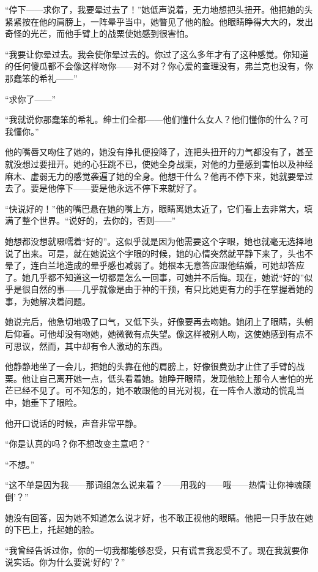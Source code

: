 \par “停下——求你了，我要晕过去了！”她低声说着，无力地想把头扭开。他把她的头紧紧按在他的肩膀上，一阵晕乎当中，她瞥见了他的脸。他眼睛睁得大大的，发出奇怪的光芒，而他手臂上的战栗使她感到很害怕。
\par “我要让你晕过去。我会使你晕过去的。你过了这么多年才有了这种感觉。你知道的任何傻瓜都不会像这样吻你——对不对？你心爱的查理没有，弗兰克也没有，你那蠢笨的希礼——”
\par “求你了——”
\par “我就说你那蠢笨的希礼。绅士们全都——他们懂什么女人？他们懂你的什么？可我懂你。”
\par 他的嘴唇又吻住了她的，她没有挣扎便投降了，连把头扭开的力气都没有了，甚至就没想过要扭开。她的心狂跳不已，使她全身战栗，对他的力量感到害怕以及神经麻木、虚弱无力的感觉袭遍了她的全身。他想干什么？他再不停下来，她就要晕过去了。要是他停下——要是他永远不停下来就好了。
\par “快说好的！”他的嘴巴悬在她的嘴上方，眼睛离她太近了，它们看上去非常大，填满了整个世界。“说好的，去你的，否则——”
\par 她想都没想就嗫嚅着“好的”。这似乎就是因为他需要这个字眼，她也就毫无选择地说了出来。可是，就在她说这个字眼的时候，她的心情突然就平静下来了，头也不晕了，连白兰地造成的晕乎感也减弱了。她根本无意答应跟他结婚，可她却答应了。她几乎都不知道这一切都是怎么一回事，可她并不后悔。现在，她说“好的”似乎是很自然的事——几乎就像是由于神的干预，有只比她更有力的手在掌握着她的事，为她解决着问题。
\par 她说完后，他急切地吸了口气，又低下头，好像要再去吻她。她闭上了眼睛，头朝后仰着。可他却没有吻她，她微微有点失望。像这样被别人吻，这使她感到有点不可思议，然而，其中却有令人激动的东西。
\par 他静静地坐了一会儿，把她的头靠在他的肩膀上，好像很费劲才止住了手臂的战栗。他让自己离开她一点，低头看着她。她睁开眼睛，发现他脸上那令人害怕的光芒已经不见了。可不知怎的，她不敢跟他的目光对视，在一阵令人激动的慌乱当中，她垂下了眼睑。
\par 他开口说话的时候，声音非常平静。
\par “你是认真的吗？你不想改变主意吧？”
\par “不想。”
\par “这不单是因为我——那词组怎么说来着？——用我的——哦——热情‘让你神魂颠倒’？”
\par 她没有回答，因为她不知道怎么说才好，也不敢正视他的眼睛。他把一只手放在她的下巴上，托起她的脸。
\par “我曾经告诉过你，你的一切我都能够忍受，只有谎言我忍受不了。现在我就要你说实话。你为什么要说‘好的’？”

